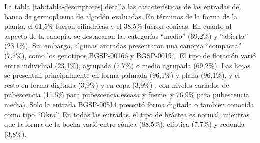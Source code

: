 \documentclass[12pt,oneside]{reedthesis}
\begin{document}
La tabla \ref{tab:tabla-descriptores} detalla las características de las entradas del banco de germoplasma de algodón evaluadas. En términos de la forma de la planta, el 61,5\% fueron cilíndricas y el 38,5\% fueron cónicas. En cuanto al aspecto de la canopia, se destacaron las categorías ``medio'' (69,2\%) y ``abierta'' (23,1\%). Sin embargo, algunas antradas presentaron una canopia ``compacta'' (7,7\%), como los genotipos BGSP-00166 y BGSP-00194. El tipo de floración varió entre individual (23,1\%), agrupada (7,7\%) o medio agrupada (69,2\%). Las hojas se presentan principalmente en forma palmada (96,1\%) y plana (96,1\%), y el resto en forma digitada (3,9\%) y en copa (3,9\%) , con niveles variados de pubescencia (11,5\% para pubescencia escasa y fuerte, y 76,9\% para pubescencia media). Solo la entrada BGSP-00514 presentó forma digitada o también conocida como tipo ``Okra''. En todas las entradas, el tipo de bráctea es normal, mientras que la forma de la bocha varió entre cónica (88,5\%), elíptica (7,7\%) y redonda (3,8\%).
\end{document}
